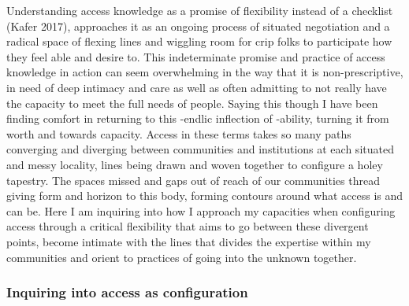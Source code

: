 Understanding access knowledge as a promise of flexibility instead of a
checklist (Kafer 2017), approaches it as an ongoing process of situated
negotiation and a radical space of flexing lines and wiggling room for
crip folks to participate how they feel able and desire to. This
indeterminate promise and practice of access knowledge in action can
seem overwhelming in the way that it is non-prescriptive, in need of
deep intimacy and care as well as often admitting to not really have the
capacity to meet the full needs of people. Saying this though I have
been finding comfort in returning to this -endlic inflection of
-ability, turning it from worth and towards capacity. Access in these
terms takes so many paths converging and diverging between communities
and institutions at each situated and messy locality, lines being drawn
and woven together to configure a holey tapestry. The spaces missed and
gaps out of reach of our communities thread giving form and horizon to
this body, forming contours around what access is and can be. Here I am
inquiring into how I approach my capacities when configuring access
through a critical flexibility that aims to go between these divergent
points, become intimate with the lines that divides the expertise within
my communities and orient to practices of going into the unknown
together.

\hypertarget{inquiring-into-access-as-configuration}{%
\subsubsection{Inquiring into access as
configuration}\label{inquiring-into-access-as-configuration}}

